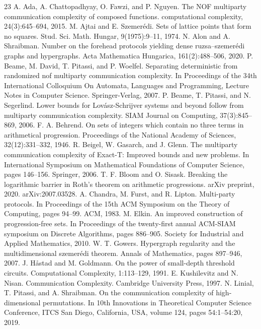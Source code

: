 \documentclass[10pt,a4paper]{article}
\begin{document}
\begin{thebibliography}{23}
 A. Ada, A. Chattopadhyay, O. Fawzi, and P. Nguyen. The NOF multiparty communication complexity of composed functions. computational complexity, 24(3):645–694, 2015.
 M. Ajtai and E. Szemerédi. Sets of lattice points that form no squares. Stud. Sci. Math. Hungar, 9(1975):9–11, 1974.
 N. Alon and A. Shraibman. Number on the forehead protocols yielding dense ruzsa–szemerédi graphs and hypergraphs. Acta Mathematica Hungarica, 161(2):488–506, 2020.
 P. Beame, M. David, T. Pitassi, and P. Woelfel. Separating deterministic from randomized nof multiparty communication complexity. In Proceedings of the 34th International Colloquium On Automata, Languages and Programming, Lecture Notes in Computer Science. Springer-Verlag, 2007.
 P. Beame, T. Pitassi, and N. Segerlind. Lower bounds for Lovász-Schrijver systems and beyond follow from multiparty communication complexity. SIAM Journal on Computing, 37(3):845–869, 2006.
 F. A. Behrend. On sets of integers which contain no three terms in arithmetical progression. Proceedings of the National Academy of Sciences, 32(12):331–332, 1946.
 R. Beigel, W. Gasarch, and J. Glenn. The multiparty communication complexity of Exact-T: Improved bounds and new problems. In International Symposium on Mathematical Foundations of Computer Science, pages 146–156. Springer, 2006.
 T. F. Bloom and O. Sisask. Breaking the logarithmic barrier in Roth’s theorem on arithmetic progressions. arXiv preprint, 2020. arXiv:2007.03528.
 A. Chandra, M. Furst, and R. Lipton. Multi-party protocols. In Proceedings of the 15th ACM Symposium on the Theory of Computing, pages 94–99. ACM, 1983.
 M. Elkin. An improved construction of progression-free sets. In Proceedings of the twenty-first annual ACM-SIAM symposium on Discrete Algorithms, pages 886–905. Society for Industrial and Applied Mathematics, 2010.
 W. T. Gowers. Hypergraph regularity and the multidimensional szemerédi theorem. Annals of Mathematics, pages 897–946, 2007.
 J. Håstad and M. Goldmann. On the power of small-depth threshold circuits. Computational Complexity, 1:113–129, 1991.
 E. Kushilevitz and N. Nisan. Communication Complexity. Cambridge University Press, 1997.
 N. Linial, T. Pitassi, and A. Shraibman. On the communication complexity of high-dimensional permutations. In 10th Innovations in Theoretical Computer Science Conference, ITCS San Diego, California, USA, volume 124, pages 54:1–54:20, 2019.

\end{thebibliography}
\end{document}
